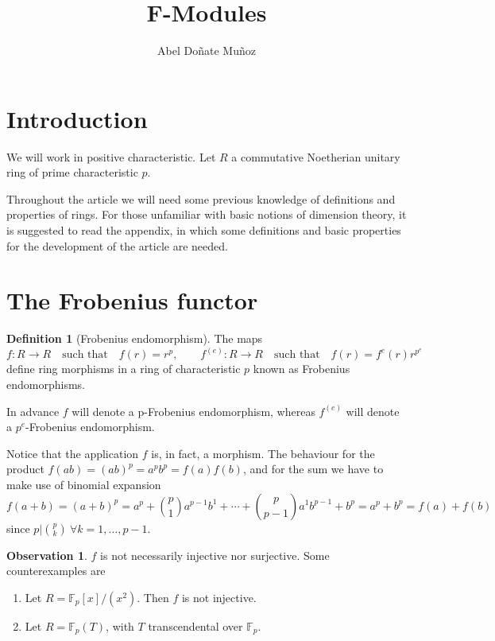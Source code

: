 \documentclass[leqno]{article}
\title{F-Modules}
\author{Abel Doñate Muñoz}
\date{}
\theoremstyle{definition}
\newtheorem{definition}{Definition}[section]
\newtheorem{observation}{Observation}[section]
\begin{document}
\maketitle
\tableofcontents
\newpage

\section{Introduction}
We will work in positive characteristic. Let $R$ a commutative Noetherian unitary ring of prime characteristic $p$.

Throughout the article we will need some previous knowledge of definitions and properties of rings. For those unfamiliar with basic notions of dimension theory, it is suggested to read the appendix, in which some definitions and basic properties for the development of the article are needed.


\section{The Frobenius functor}

\begin{definition}[Frobenius endomorphism] The maps
\[
  f: R \to R \quad \text{such that} \quad f(r) = r^p, \qquad 
  f ^{(e)}: R \to R \quad \text{such that} \quad f(r) = f^e(r) r^{p^e}
\] 
define ring morphisms in a ring of characteristic $p$ known as Frobenius endomorphisms.
\end{definition}

In advance $f$ will denote a p-Frobenius endomorphism, whereas  $f^{(e)}$ will denote a  $p^e$-Frobenius endomorphism.

Notice that the application $f$ is, in fact, a morphism. The behaviour for the product $f(ab)=(ab)^p=a^pb^p=f(a)f(b)$, and for the sum we have to make use of binomial expansion
\[
  f(a+b) = (a+b)^p = a^p + \binom{p}{1} a^{p-1}b^1 + \cdots + \binom{p}{p-1}a^{1}b^{p-1} + b^p = a^p + b^p = f(a) + f(b)
\] 
since $p|\binom{p}{k} \ \forall k=1, \ldots, p-1$.

\begin{observation} $f$ is not necessarily injective nor surjective. Some counterexamples are
   \begin{enumerate}[topsep=-6pt, itemsep=0pt]
	 \item Let $R = \mathbb{F}_p[x] / (x^2)$. Then $f$ is not injective.
	 \item Let  $R = \mathbb{F}_p(T)$, with $T$ transcendental over  $\mathbb{F}_p$.
  \end{enumerate}
\end{observation}
\end{document}
